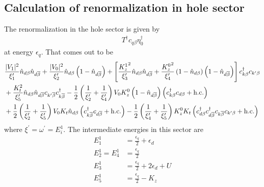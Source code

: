 \documentclass[12pt,twoside]{article}
\numberwithin{equation}{section}
\begin{document}
\subsection{Calculation of renormalization in hole sector}
The renormalization in the hole sector is given by
\begin{equation}\begin{aligned}
	T^\dagger c_{q\beta}\eta_0^\dagger
\end{aligned}\end{equation}
at energy \(\epsilon_q\). That comes out to be
\begin{equation}\begin{aligned}
&\frac{|V_1|^2}{\xi^\prime_1}\hat n_{d\beta}\hat n_{d\overline\beta} + \frac{|V_0|^2}{\xi^\prime_2}\hat n_{d\beta}\left(1 - \hat n_{d\overline\beta}\right) + \left[\frac{{K_z^1}^2}{\xi^\prime_3}\hat n_{d\beta}\hat n_{d\overline\beta} + \frac{{K_z^0}^2}{\xi^\prime_4}\left(1 - \hat n_{d\beta}\right)\left(1 - \hat n_{d\overline\beta}\right)\right]c^\dagger_{k\beta}c_{k^\prime\beta}\\
&+\frac{K_t^2}{\xi^\prime_5}\hat n_{d\beta}\hat n_{d\overline\beta}c_{k^\prime\overline\beta}c^\dagger_{k\overline\beta} - \frac{1}{2}\left(\frac{1}{\xi^\prime_2} + \frac{1}{\xi^\prime_4}\right)V_0 K_z^0\left(1 - \hat n_{d\overline\beta}\right)\left(c^\dagger_{k\beta}c_{d\beta} + \text{h.c.}\right) \\
&+ \frac{1}{2}\left(\frac{1}{\xi^\prime_2} + \frac{1}{\xi^\prime_5}\right)V_0 K_t\hat n_{d\beta}\left(c^\dagger_{k\overline\beta}c_{d\overline\beta} + \text{h.c.}\right) - \frac{1}{2}\left(\frac{1}{\xi^\prime_4} + \frac{1}{\xi^\prime_5}\right)K_z^0 K_t\left(c^\dagger_{d\beta}c^\dagger_{d\overline\beta}c_{k\overline\beta}c_{k^\prime\beta} + \text{h.c.}\right) 
\end{aligned}\end{equation}
where \(\xi^\prime = \omega^\prime = E_i^1\). The intermediate energies in this sector are
\begin{equation}\begin{aligned}
	E^1_1 &= \frac{\epsilon_q}{2} + \epsilon_d\\
	E^1_2 = E_4^1 &= \frac{\epsilon_q}{2}\\
	E^1_3 &= \frac{\epsilon_q}{2} + 2\epsilon_d + U\\
	E_5^1 &= \frac{\epsilon_q}{2} - K_z\\
\end{aligned}\end{equation}
\end{document}
